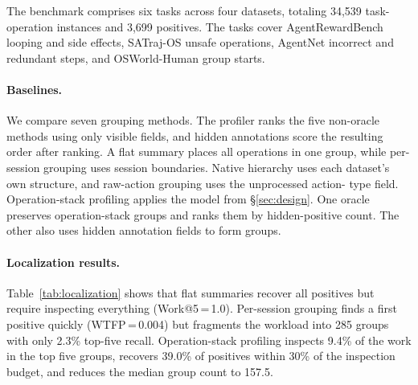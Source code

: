 \documentclass[letterpaper]{article}
\begin{document}
The benchmark comprises six tasks across four datasets, totaling 34{,}539
task-operation instances and 3{,}699 positives. The tasks cover
AgentRewardBench looping and side effects, SATraj-OS unsafe operations,
AgentNet incorrect and redundant steps, and OSWorld-Human group starts.

\paragraph{Baselines.}
We compare seven grouping methods. The profiler ranks the five non-oracle
methods using only visible fields, and hidden annotations score the resulting
order after ranking. A flat summary places all operations in one group, while
per-session grouping uses session boundaries. Native hierarchy uses each
dataset's own structure, and raw-action grouping uses the unprocessed action-
type field. Operation-stack profiling applies the model from
\S\ref{sec:design}. One oracle preserves operation-stack groups and ranks them
by hidden-positive count. The other also uses hidden annotation fields to form
groups.

\paragraph{Localization results.}
Table~\ref{tab:localization} shows that flat summaries recover all positives
but require inspecting everything (Work@5\,=\,1.0).
Per-session grouping finds a first positive quickly (WTFP\,=\,0.004) but fragments the workload into 285 groups with only 2.3\% top-five recall.
Operation-stack profiling inspects 9.4\% of the work in the top five groups,
recovers 39.0\% of positives within 30\% of the inspection budget, and reduces
the median group count to 157.5.
\end{document}
